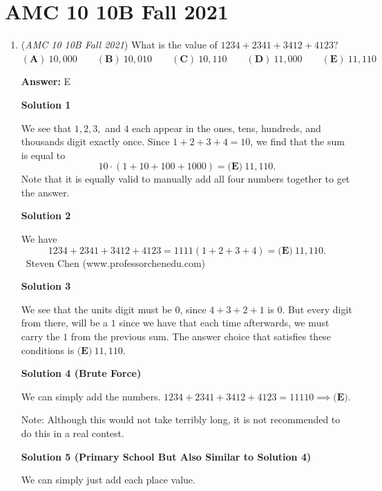 \section{AMC 10 10B Fall 2021}
        \begin{enumerate}
        	\item (\textit{AMC 10 10B Fall 2021}) What is the value of $1234+2341+3412+4123?$
$(\textbf{A})\: 10{,}000\qquad(\textbf{B}) \: 10{,}010\qquad(\textbf{C}) \: 10{,}110\qquad(\textbf{D}) \: 11{,}000\qquad(\textbf{E}) \: 11{,}110$

 \textbf{Answer: }E



\textbf{Solution 1}

We see that $1, 2, 3,$ and $4$ each appear in the ones, tens, hundreds, and thousands digit exactly once. Since $1+2+3+4=10$, we find that the sum is equal to 
 \[10\cdot(1+10+100+1000)=\boxed{\textbf{(E)} \: 11{,}110}.\]Note that it is equally valid to manually add all four numbers together to get the answer.

 



\textbf{Solution 2}

We have 
 \[1234 + 2341 + 3412 + 4123 = 1111 \left( 1 + 2 + 3 + 4 \right) = \boxed{\textbf{(E)} \: 11{,}110}.\]~Steven Chen (www.professorchenedu.com)

 



\textbf{Solution 3}

We see that the units digit must be $0$, since $4+3+2+1$ is $0$. But every digit from there, will be a $1$ since we have that each time afterwards, we must carry the $1$ from the previous sum. The answer choice that satisfies these conditions is $\boxed{\textbf{(E)} \: 11{,}110}$.

 



\textbf{Solution 4 (Brute Force)}

We can simply add the numbers. $1234 + 2341 + 3412 + 4123 = 11110 \implies \boxed{\textbf{(E)}}$.

 Note: Although this would not take terribly long, it is not recommended to do this in a real contest.

 



\textbf{Solution 5 (Primary School But Also Similar to Solution 4)}

We can simply just add each place value. 


\end{enumerate}

